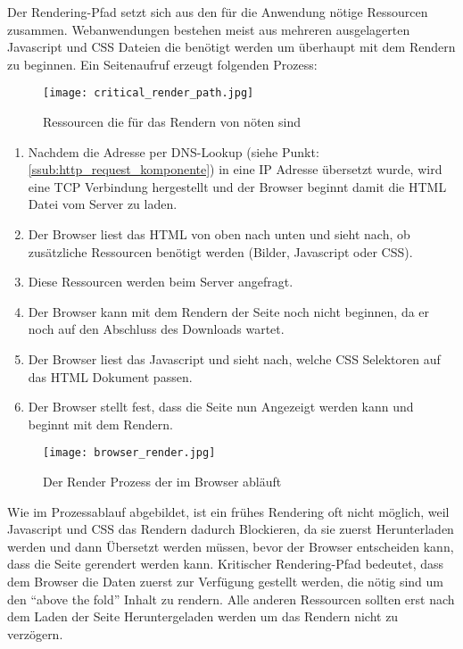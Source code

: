 			Der Rendering-Pfad setzt sich aus den für die Anwendung nötige Ressourcen zusammen. Webanwendungen bestehen meist aus mehreren ausgelagerten Javascript und CSS Dateien die benötigt werden um überhaupt mit dem Rendern zu beginnen. Ein Seitenaufruf erzeugt folgenden Prozess:
			\begin{figure}[htbp]
				\begin{center}
					\texttt{[image: critical\_render\_path.jpg]}
					\caption{Ressourcen die für das Rendern von nöten sind}
					\label{fig:critical_render_path}
				\end{center}
			\end{figure}

			\begin{enumerate}
				\item Nachdem die Adresse per DNS-Lookup (siehe Punkt: \ref{ssub:http_request_komponente}) in eine IP Adresse übersetzt wurde, wird eine TCP Verbindung hergestellt und der Browser beginnt damit die HTML Datei vom Server zu laden.
				\item Der Browser liest das HTML von oben nach unten und sieht nach, ob zusätzliche Ressourcen benötigt werden (Bilder, Javascript oder CSS).
				\item Diese Ressourcen werden beim Server angefragt.
				\item Der Browser kann mit dem Rendern der Seite noch nicht beginnen, da er noch auf den Abschluss des Downloads wartet.
				\item Der Browser liest das Javascript und sieht nach, welche CSS Selektoren auf das HTML Dokument passen.
				\item Der Browser stellt fest, dass die Seite nun Angezeigt werden kann und beginnt mit dem Rendern.
			\end{enumerate}

			\begin{figure}[htbp]
				\begin{center}
					\texttt{[image: browser\_render.jpg]}
					\caption{Der Render Prozess der im Browser abläuft}
					\label{fig:browser_render}
				\end{center}
			\end{figure}
		
			Wie im Prozessablauf abgebildet, ist ein frühes Rendering oft nicht möglich, weil Javascript und CSS das Rendern dadurch Blockieren, da sie zuerst Herunterladen werden und dann Übersetzt werden müssen, bevor der Browser entscheiden kann, dass die Seite gerendert werden kann. Kritischer Rendering-Pfad bedeutet, dass dem Browser die Daten zuerst zur Verfügung gestellt werden, die nötig sind um den "`above the fold"' Inhalt zu rendern. Alle anderen Ressourcen sollten erst nach dem Laden der Seite Heruntergeladen werden um das Rendern nicht zu verzögern. 

